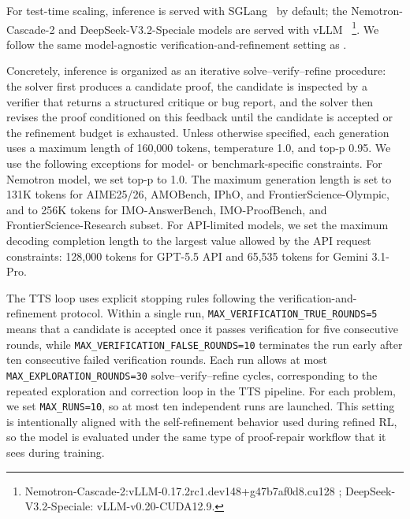 \documentclass{llmxive}
\begin{document}

For test-time scaling, inference is served with SGLang~\citep{sglang2026repo} by default; the Nemotron-Cascade-2 and DeepSeek-V3.2-Speciale models are served with vLLM~\citep{vllm2026repo} \footnote{Nemotron-Cascade-2:vLLM-0.17.2rc1.dev148+g47b7af0d8.cu128 ; DeepSeek-V3.2-Speciale: vLLM-v0.20-CUDA12.9.}. We follow the same model-agnostic verification-and-refinement setting as \citet{huang2025winning}. 

Concretely, inference is organized as an iterative solve--verify--refine procedure: the solver first produces a candidate proof, the candidate is inspected by a verifier that returns a structured critique or bug report, and the solver then revises the proof conditioned on this feedback until the candidate is accepted or the refinement budget is exhausted. 
Unless otherwise specified, each generation uses a maximum length of 160,000 tokens, temperature 1.0, and top-p 0.95. We use the following exceptions for model- or benchmark-specific constraints. For Nemotron model, we set top-p to 1.0. The maximum generation length is set to 131K tokens for AIME25/26, AMOBench, IPhO, and FrontierScience-Olympic, and to 256K tokens for IMO-AnswerBench, IMO-ProofBench, and FrontierScience-Research subset. 
For API-limited models, we set the maximum decoding completion length to the largest value allowed by the API request constraints: 128,000 tokens for GPT-5.5 API and 65,535 tokens for Gemini 3.1-Pro.

The TTS loop uses explicit stopping rules following the verification-and-refinement protocol. Within a single run, \texttt{MAX\_VERIFICATION\_TRUE\_ROUNDS=5} means that a candidate is accepted once it passes verification for five consecutive rounds, while \texttt{MAX\_VERIFICATION\_FALSE\_ROUNDS=10} terminates the run early after ten consecutive failed verification rounds. Each run allows at most \texttt{MAX\_EXPLORATION\_ROUNDS=30} solve--verify--refine cycles, corresponding to the repeated exploration and correction loop in the TTS pipeline. For each problem, we set \texttt{MAX\_RUNS=10}, so at most ten independent runs are launched. This setting is intentionally aligned with the self-refinement behavior used during refined RL, so the model is evaluated under the same type of proof-repair workflow that it sees during training.
\end{document}
